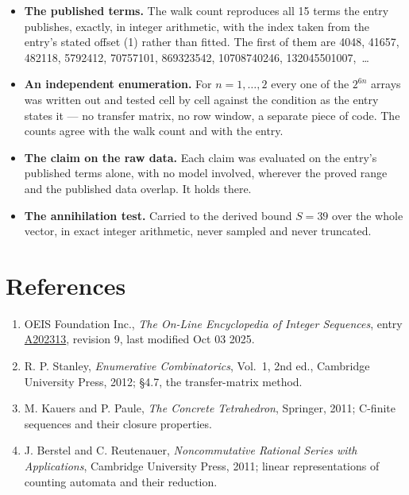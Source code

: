 \documentclass[11pt]{article}
\theoremstyle{definition}
\begin{document}
\begin{itemize}

\item {\bfseries The published terms.} The walk count reproduces all 15 terms the entry publishes, exactly, in integer arithmetic, with the index taken from the entry's stated offset (1) rather than fitted. The first of them are 4048, 41657, 482118, 5792412, 70757101, 869323542, 10708740246, 132045501007,~\dots

\item {\bfseries An independent enumeration.} For $n = 1,\dots,2$ every one of the $2^{6n}$ arrays was written out and tested cell by cell against the condition as the entry states it --- no transfer matrix, no row window, a separate piece of code. The counts agree with the walk count and with the entry.

\item {\bfseries The claim on the raw data.} Each claim was evaluated on the entry's published terms alone, with no model involved, wherever the proved range and the published data overlap. It holds there.

\item {\bfseries The annihilation test.} Carried to the derived bound $S = 39$ over the whole vector, in exact integer arithmetic, never sampled and never truncated.

\end{itemize}

\section{References}

\begin{enumerate}

\item OEIS Foundation Inc., \emph{The On-Line Encyclopedia of Integer Sequences}, entry \href{https://oeis.org/A202313}{A202313}, revision 9, last modified Oct 03 2025.

\item R. P. Stanley, \emph{Enumerative Combinatorics}, Vol.~1, 2nd ed., Cambridge University Press, 2012; \S4.7, the transfer-matrix method.

\item M. Kauers and P. Paule, \emph{The Concrete Tetrahedron}, Springer, 2011; C-finite sequences and their closure properties.

\item J. Berstel and C. Reutenauer, \emph{Noncommutative Rational Series with Applications}, Cambridge University Press, 2011; linear representations of counting automata and their reduction.

\end{enumerate}
\end{document}
